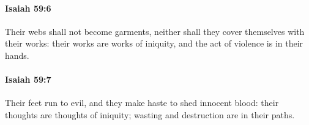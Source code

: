 		\paragraph{Isaiah 59:6} %
			\label{ISAIAH-59-6}

			Their webs shall not become garments, neither shall they cover themselves with their works: their works are works of iniquity, and the act of violence is in their hands.


		\paragraph{Isaiah 59:7} %
			\label{ISAIAH-59-7}

			Their feet run to evil, and they make haste to shed innocent blood: their thoughts are thoughts of iniquity; wasting and destruction are in their paths.


